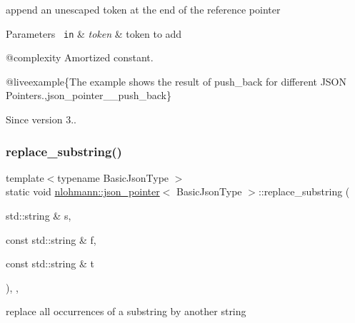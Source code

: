append an unescaped token at the end of the reference pointer 


\begin{DoxyParams}[1]{Parameters}
\mbox{\texttt{ in}}  & {\em token} & token to add\\
\hline
\end{DoxyParams}
@complexity Amortized constant.

@liveexample\{The example shows the result of {\ttfamily push\+\_\+back} for different J\+S\+ON Pointers.,json\+\_\+pointer\+\_\+\+\_\+push\+\_\+back\}

\begin{DoxySince}{Since}
version 3.. 
\end{DoxySince}
\mbox{\label{classnlohmann_1_1json__pointer_aa7649d30da9fc10b0e20704a27aea2a9}} 
\subsubsection{\texorpdfstring{replace\_substring()}{replace\_substring()}}
{\footnotesize\ttfamily template$<$typename Basic\+Json\+Type $>$ \\
static void \mbox{\hyperlink{classnlohmann_1_1json__pointer}{nlohmann\+::json\+\_\+pointer}}$<$ Basic\+Json\+Type $>$\+::replace\+\_\+substring (\begin{DoxyParamCaption}\item[{std\+::string \&}]{s,  }\item[{const std\+::string \&}]{f,  }\item[{const std\+::string \&}]{t }\end{DoxyParamCaption})\hspace{0.3cm}{\ttfamily [inline]}, {\ttfamily [static]}, {\ttfamily [private]}}



replace all occurrences of a substring by another string 


